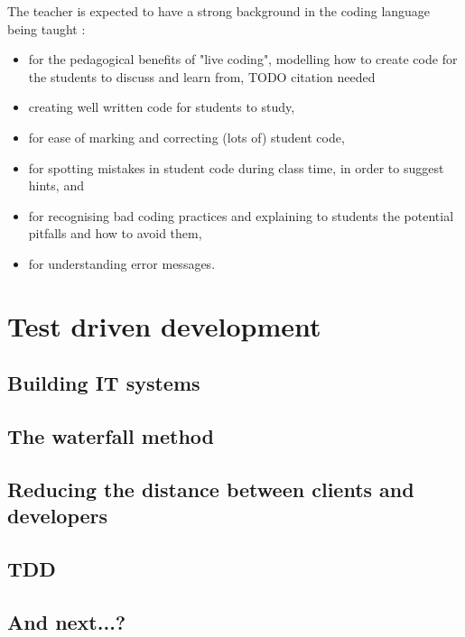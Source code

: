 \documentclass[10pt]{article}
\begin{document}
The teacher is expected to have a strong background in the coding language being taught :
\begin{itemize}
\item for the pedagogical benefits of "live coding", modelling how to create code for the students to discuss and learn from, TODO citation needed
\item creating well written code for students to study,
\item for ease of marking and correcting (lots of) student code,
\item for spotting mistakes in student code during class time, in order to suggest hints, and
\item for recognising bad coding practices and explaining to students the potential pitfalls and how to avoid them,
\item for understanding error messages.
\end{itemize}







\section{Test driven development} \label{tdd}

\subsection{Building IT systems}

\subsection{The waterfall method}

\subsection{Reducing the distance between clients and developers}

\subsection{TDD}

\subsection{And next...?}
\end{document}
